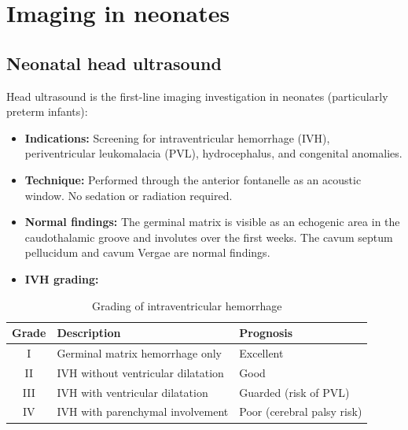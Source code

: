 \section{Imaging in neonates}

\subsection{Neonatal head ultrasound}
Head ultrasound is the first-line imaging investigation in neonates (particularly preterm infants):
\begin{itemize}
    \item \textbf{Indications:} Screening for intraventricular hemorrhage (IVH), periventricular leukomalacia (PVL), hydrocephalus, and congenital anomalies.
    \item \textbf{Technique:} Performed through the anterior fontanelle as an acoustic window. No sedation or radiation required.
    \item \textbf{Normal findings:} The germinal matrix is visible as an echogenic area in the caudothalamic groove and involutes over the first weeks. The cavum septum pellucidum and cavum Vergae are normal findings.
    \item \textbf{IVH grading:}
\end{itemize}

\begin{table}[h]
\centering
\caption{Grading of intraventricular hemorrhage}
\label{tab:ivh}
\begin{tabular}{cll}
\hline
\textbf{Grade} & \textbf{Description} & \textbf{Prognosis} \\
\hline
I & Germinal matrix hemorrhage only & Excellent \\
II & IVH without ventricular dilatation & Good \\
III & IVH with ventricular dilatation & Guarded (risk of PVL) \\
IV & IVH with parenchymal involvement & Poor (cerebral palsy risk) \\
\hline
\end{tabular}
\end{table}

